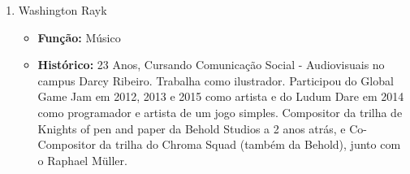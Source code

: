 \documentclass[a4paper, 11pt]{article} %
\begin{document}
\begin{enumerate}
\item Washington Rayk

\begin{itemize}
\item \textbf{Função:} Músico
\item \textbf{Histórico:} 23 Anos, Cursando Comunicação Social - Audiovisuais no campus Darcy Ribeiro. Trabalha como ilustrador. Participou do Global Game Jam em 2012, 2013 e 2015 como artista e do Ludum Dare em 2014 como programador e artista de um jogo simples. Compositor da trilha de Knights of pen and paper  da Behold Studios a 2 anos atrás, e Co-Compositor da trilha do Chroma Squad (também da Behold), junto com o Raphael Müller.
\end{itemize}
\end{enumerate}
\end{document}

